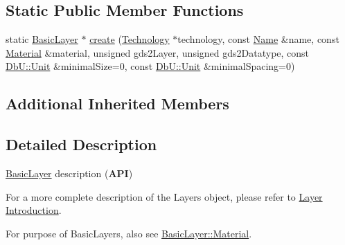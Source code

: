 \subsection*{Static Public Member Functions}
\begin{DoxyCompactItemize}
\item 
static \hyperlink{classHurricane_1_1BasicLayer}{Basic\-Layer} $\ast$ \hyperlink{classHurricane_1_1BasicLayer_a76ccb64abaaf9c834c8ee8f010d5d24f}{create} (\hyperlink{classHurricane_1_1Technology}{Technology} $\ast$technology, const \hyperlink{classHurricane_1_1Name}{Name} \&name, const \hyperlink{classHurricane_1_1BasicLayer_1_1Material}{Material} \&material, unsigned gds2\-Layer, unsigned gds2\-Datatype, const \hyperlink{group__DbUGroup_ga4fbfa3e8c89347af76c9628ea06c4146}{Db\-U\-::\-Unit} \&minimal\-Size=0, const \hyperlink{group__DbUGroup_ga4fbfa3e8c89347af76c9628ea06c4146}{Db\-U\-::\-Unit} \&minimal\-Spacing=0)
\end{DoxyCompactItemize}
\subsection*{Additional Inherited Members}


\subsection{Detailed Description}
\hyperlink{classHurricane_1_1BasicLayer}{Basic\-Layer} description ({\bfseries A\-P\-I}) 

For a more complete description of the Layers object, please refer to \hyperlink{classHurricane_1_1Layer_secLayerIntro}{Layer Introduction}.

For purpose of Basic\-Layers, also see \hyperlink{classHurricane_1_1BasicLayer_1_1Material}{Basic\-Layer\-::\-Material}. 

